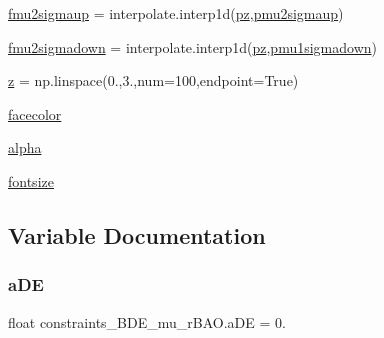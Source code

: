 \begin{DoxyCompactItemize}
$$\item 
\mbox{\hyperlink{namespaceconstraints__BDE__mu__rBAO_a9ba176a81006e6455ae58b1d263e8076}{fmu2sigmaup}} = interpolate.\+interp1d(\mbox{\hyperlink{namespaceconstraints__BDE__mu__rBAO_adeb1878b53df598f2a0e4fa576d0ead1}{pz}},\mbox{\hyperlink{namespaceconstraints__BDE__mu__rBAO_aa80732f50f13e322e39d3b38f112fa59}{pmu2sigmaup}})
\item 
\mbox{\hyperlink{namespaceconstraints__BDE__mu__rBAO_a52a3828ce6cc623ba6949ece84f33d22}{fmu2sigmadown}} = interpolate.\+interp1d(\mbox{\hyperlink{namespaceconstraints__BDE__mu__rBAO_adeb1878b53df598f2a0e4fa576d0ead1}{pz}},\mbox{\hyperlink{namespaceconstraints__BDE__mu__rBAO_af34a46b04ed1b2eba4dca89e8c8eb37d}{pmu1sigmadown}})
\item 
\mbox{\hyperlink{namespaceconstraints__BDE__mu__rBAO_a0897a48e9594ce1cbdcd1ea9fd485694}{z}} = np.\+linspace(0.,3.,num=100,endpoint=True)
\item 
\mbox{\hyperlink{namespaceconstraints__BDE__mu__rBAO_aec2cea379190825b314f2a08d2c8c58e}{facecolor}}
\item 
\mbox{\hyperlink{namespaceconstraints__BDE__mu__rBAO_af427df4496c3a597ab30183316c67b68}{alpha}}
\item 
\mbox{\hyperlink{namespaceconstraints__BDE__mu__rBAO_a6a69674c495c02800d135e53ad77c18d}{fontsize}}
\end{DoxyCompactItemize}


\subsection{Variable Documentation}
\mbox{\label{namespaceconstraints__BDE__mu__rBAO_abb8115fc92777b302cf81b2cf8a3cae3}} 
\subsubsection{\texorpdfstring{a\+DE}{aDE}}
{\footnotesize\ttfamily float constraints\+\_\+\+B\+D\+E\+\_\+mu\+\_\+r\+B\+A\+O.\+a\+DE = 0.}

\mbox{\label{namespaceconstraints__BDE__mu__rBAO_af427df4496c3a597ab30183316c67b68}} 

